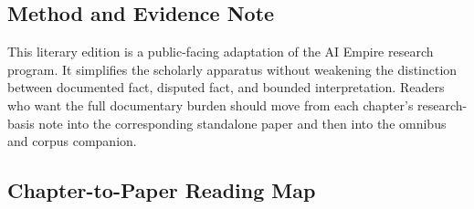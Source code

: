 \documentclass[
  american,
  12pt,
  letterpaper,
]{article}
\begin{document}
\subsection{Method and Evidence Note}\label{method-and-evidence-note}

This literary edition is a public-facing adaptation of the AI Empire
research program. It simplifies the scholarly apparatus without
weakening the distinction between documented fact, disputed fact, and
bounded interpretation. Readers who want the full documentary burden
should move from each chapter's research-basis note into the
corresponding standalone paper and then into the omnibus and corpus
companion.

\subsection{Chapter-to-Paper Reading
Map}\label{chapter-to-paper-reading-map}
\end{document}
